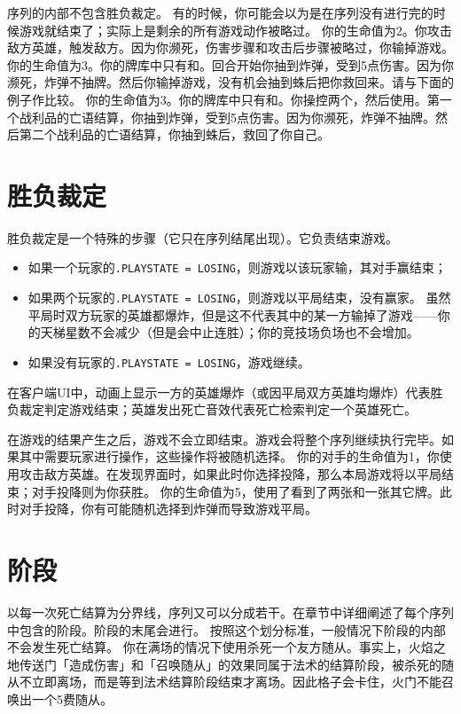 序列的内部不包含胜负裁定。
\notice 有的时候，你可能会以为是在序列没有进行完的时候游戏就结束了；实际上是剩余的所有游戏动作被略过。
\example 你的生命值为2。你攻击敌方英雄，触发敌方。因为你濒死，伤害步骤和攻击后步骤被略过，你输掉游戏。
\example 你的生命值为3。你的牌库中只有和。回合开始你抽到炸弹，受到5点伤害。因为你濒死，炸弹不抽牌。然后你输掉游戏，没有机会抽到蛛后把你救回来。请与下面的例子作比较。
\example 你的生命值为3。你的牌库中只有和。你操控两个，然后使用。第一个战利品的亡语结算，你抽到炸弹，受到5点伤害。因为你濒死，炸弹不抽牌。然后第二个战利品的亡语结算，你抽到蛛后，救回了你自己。

\section{胜负裁定}
\label{winner-check}

胜负裁定是一个特殊的步骤（它只在序列结尾出现）。它负责结束游戏。

\begin{itemize}
    \item 如果一个玩家的\texttt{.PLAYSTATE = LOSING}，则游戏以该玩家输，其对手赢结束；
    \item 如果两个玩家的\texttt{.PLAYSTATE = LOSING}，则游戏以平局结束，没有赢家。
        \notice 虽然平局时双方玩家的英雄都爆炸，但是这不代表其中的某一方输掉了游戏——你的天梯星数不会减少（但是会中止连胜）；你的竞技场负场也不会增加。
    \item 如果没有玩家的\texttt{.PLAYSTATE = LOSING}，游戏继续。
\end{itemize}

在客户端UI中，动画上显示一方的英雄爆炸（或因平局双方英雄均爆炸）代表胜负裁定判定游戏结束；英雄发出死亡音效代表死亡检索判定一个英雄死亡。

在游戏的结果产生之后，游戏不会立即结束。游戏会将整个序列继续执行完毕。如果其中需要玩家进行操作，这些操作将被随机选择。
\example 你的对手的生命值为1，你使用攻击敌方英雄。在发现界面时，如果此时你选择投降，那么本局游戏将以平局结束；对手投降则为你获胜。
\example 你的生命值为5，使用了看到了两张和一张其它牌。此时对手投降，你有可能随机选择到炸弹而导致游戏平局。

\section{阶段}
\label{pahse}

以每一次死亡结算为分界线，序列又可以分成若干。在章节中详细阐述了每个序列中包含的阶段。阶段的末尾会进行。
\notice 按照这个划分标准，一般情况下阶段的内部不会发生死亡结算。
\example 你在满场的情况下使用杀死一个友方随从。事实上，火焰之地传送门「造成伤害」和「召唤随从」的效果同属于法术的结算阶段，被杀死的随从不立即离场，而是等到法术结算阶段结束才离场。因此格子会卡住，火门不能召唤出一个5费随从。

